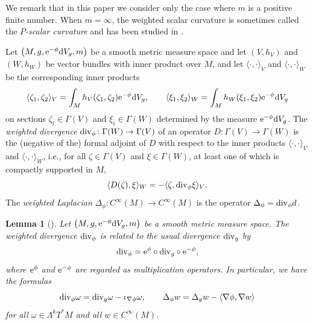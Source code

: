 \documentclass[10pt,a4paper]{amsart}
\numberwithin{equation}{section}
\newtheorem{Lemma}[Theorem]{Lemma}
\begin{document}
We remark that in this paper we consider only the case where $m$ is a positive finite number. When $m=\infty$, the weighted scalar curvature is sometimes called the \textit{$P$-scalar curvature} and has been studied in \cite{Abedin&Corvino}.

\begin{Definition}
 Let $\bigl(M,g,{\rm e}^{-\phi}{\rm d}V_g,m\bigr)$ be a smooth metric measure space and let $(V,h_V)$ and $(W,h_W)$ be vector bundles with inner product over $M$, and let $\langle\cdot,\cdot\rangle_V$ and $\langle \cdot,\cdot\rangle_W$ be the corresponding inner products
 \begin{equation*}
 \langle \zeta_1,\zeta_2\rangle_V=\int_M h_V(\zeta_1,\zeta_2){\rm e}^{-\phi}{\rm d}V_g,\qquad
 \langle \xi_1,\xi_2\rangle_W=\int_M h_W(\xi_1,\xi_2){\rm e}^{-\phi}{\rm d}V_g
 \end{equation*}
 on sections $\zeta_i\in \Gamma(V)$ and $\xi_i\in\Gamma(W)$ determined by the measure ${\rm e}^{-\phi}{\rm d}V_g$. The \textit{weighted divergence} ${\rm div}_\phi\colon\Gamma(W)\to \Gamma(V)$ of an operator $D\colon\Gamma(V)\to \Gamma(W)$ is the (negative of the) formal adjoint of $D$ with respect to the inner products $\langle\cdot,\cdot\rangle_V$ and $\langle\cdot,\cdot\rangle_W$, i.e., for all $\zeta\in \Gamma(V)$ and $\xi\in \Gamma(W)$, at least one of which is compactly supported in $M$,
 \begin{equation*}
 \langle D(\zeta),\xi\rangle_W=-\langle \zeta,{\rm div}_\phi\xi\rangle_V.
 \end{equation*}
 The \textit{weighted Laplacian} $\Delta_\phi\colon C^\infty(M)\to C^\infty(M)$ is the operator $\Delta_\phi={\rm div}_\phi d$.
\end{Definition}

\begin{Lemma}[{\cite[Lemma 3.5]{Case4}}]
Let $\bigl(M,g,{\rm e}^{-\phi}{\rm d}V_g,m\bigr)$ be a smooth metric measure space.
The weighted divergence ${\rm div}_\phi$ is related to the usual divergence ${\rm div}_g$ by
\begin{equation*}
 {\rm div}_\phi={\rm e}^{\phi}\circ {\rm div}_g\circ {\rm e}^{-\phi},
\end{equation*}
where ${\rm e}^\phi$ and ${\rm e}^{-\phi}$ are regarded as multiplication operators. In particular, we have the formulas%
 \begin{equation*}
 {\rm div}_\phi \omega={\rm div}_g\omega-\iota_{\nabla \phi}\omega,\qquad
 \Delta_\phi w=\Delta_gw-\langle \nabla \phi,\nabla w\rangle
 \end{equation*}
 for all $\omega\in \Lambda^kT^*M$ and all $w\in C^\infty(M)$.
\end{Lemma}
\end{document}
